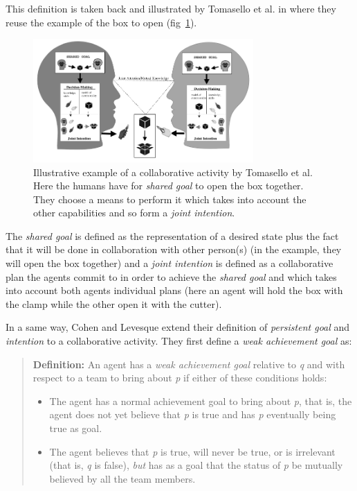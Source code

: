\documentclass[english,a4paper,11pt,twoside]{StyleThese}
\begin{document}
This definition is taken back and illustrated by Tomasello et al. in \cite{tomasello2005understanding} where they reuse the example of the box to open (fig~\ref{fig:intention_jointe}).

\begin{figure}[!h]
	\centering
    \includegraphics[width=0.75\textwidth]{figs/Chapter1/intention_jointe.png}
    \caption{Illustrative example of a collaborative activity by Tomasello et al. Here the humans have for \textit{shared goal} to open the box together. They choose a means to perform it which takes into account the other capabilities and so form a \textit{joint intention}.}
    \label{fig:intention_jointe}
\end{figure}

The \textit{shared goal} is defined as the representation of a desired state plus the fact that it will be done in collaboration with other person(s) (in the example, they will open the box together) and a \textit{joint intention} is defined as a collaborative plan the agents commit to in order to achieve the \textit{shared goal} and which takes into account both agents individual plans (here an agent will hold the box with the clamp while the other open it with the cutter).

In a same way, Cohen and Levesque extend their definition of \textit{persistent goal} and \textit{intention} to a collaborative activity. They first define a \textit{weak achievement goal} as:
\begin{quote}
\textbf{Definition: } An agent has a \textit{weak achievement goal} relative to \textit{q} and with respect to a team to bring about \textit{p} if either of these conditions holds:
\begin{itemize}
\item The agent has a normal achievement goal to bring about \textit{p}, that is, the agent does not yet believe that \textit{p} is true and has \textit{p} eventually being true as goal.
\item The agent believes that \textit{p} is true, will never be true, or is irrelevant (that is, \textit{q} is false), \textit{but} has as a goal that the status of \textit{p} be mutually believed by all the team members.
\end{itemize}
\end{quote}
\end{document}
